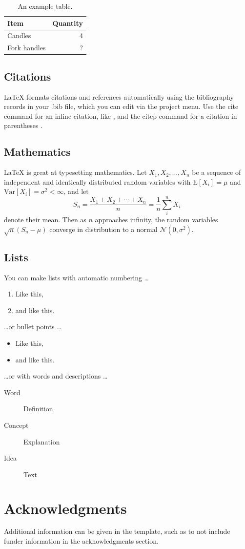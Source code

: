 \documentclass[fleqn,10pt]{olplainarticle}
\begin{document}
	\begin{table}[ht]
		\centering
		\begin{tabular}{l|r}
			Item & Quantity \\\hline
			Candles & 4 \\
			Fork handles & ?  
		\end{tabular}
		\caption{\label{tab:widgets}An example table.}
	\end{table}
	
	\subsection*{Citations}
	
	LaTeX formats citations and references automatically using the bibliography records in your .bib file, which you can edit via the project menu. Use the cite command for an inline citation, like \cite{lees2010theoretical}, and the citep command for a citation in parentheses \citep{lees2010theoretical}.
	
	\subsection*{Mathematics}
	
	\LaTeX{} is great at typesetting mathematics. Let $X_1, X_2, \ldots, X_n$ be a sequence of independent and identically distributed random variables with $\text{E}[X_i] = \mu$ and $\text{Var}[X_i] = \sigma^2 < \infty$, and let
	$$S_n = \frac{X_1 + X_2 + \cdots + X_n}{n}
	= \frac{1}{n}\sum_{i}^{n} X_i$$
	denote their mean. Then as $n$ approaches infinity, the random variables $\sqrt{n}(S_n - \mu)$ converge in distribution to a normal $\mathcal{N}(0, \sigma^2)$.
	
	\subsection*{Lists}
	
	You can make lists with automatic numbering \dots
	
	\begin{enumerate}[noitemsep] 
		\item Like this,
		\item and like this.
	\end{enumerate}
	\dots or bullet points \dots
	\begin{itemize}[noitemsep] 
		\item Like this,
		\item and like this.
	\end{itemize}
	\dots or with words and descriptions \dots
	\begin{description}
		\item[Word] Definition
		\item[Concept] Explanation
		\item[Idea] Text
	\end{description}
	
	\section*{Acknowledgments}
	
	Additional information can be given in the template, such as to not include funder information in the acknowledgments section.
	
	
	
\end{document}
